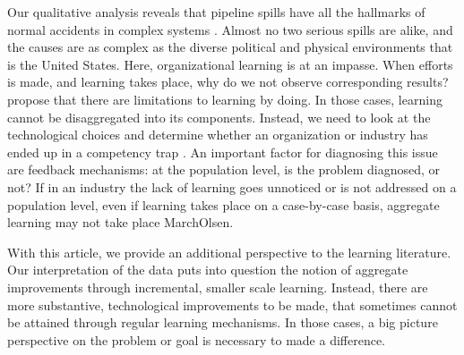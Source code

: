 Our qualitative analysis reveals that pipeline spills have all the hallmarks of normal accidents in complex systems \citep{Perrow1984}. Almost no two serious spills are alike, and the causes are as complex as the diverse political and physical environments that is the United States. Here, organizational learning is at an impasse. When efforts is made, and learning takes place, why do we not observe corresponding results? \citet{Levitt1988} propose that there are limitations to learning by doing. In those cases, learning cannot be disaggregated into its components. Instead, we need to look at the technological choices and determine whether an organization or industry has ended up in a competency trap \citep{Levitt1988}. An important factor for diagnosing this issue are feedback mechanisms: at the population level, is the problem diagnosed, or not? If in an industry the lack of learning goes unnoticed or is not addressed on a population level, even if learning takes place on a case-by-case basis, aggregate learning may not take place {MarchOlsen}.   

With this article, we provide an additional perspective to the learning literature. Our interpretation of the data puts into question the notion of aggregate improvements through incremental, smaller scale learning. Instead, there are more substantive, technological improvements to be made, that sometimes cannot be attained through regular learning mechanisms. In those cases, a big picture perspective on the problem or goal is necessary to made a difference.







